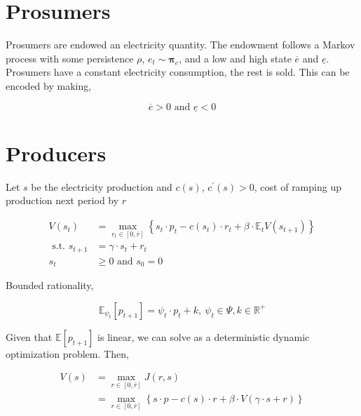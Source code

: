 \documentclass[american]{scrartcl}
\newcommand{\E}{\mathbb{E}}
\newcommand{\R}{\mathbb{R}}
\newcommand{\matr}[1]{\bm{#1}}
\begin{document}
\section{Prosumers}

Prosumers are endowed an electricity quantity. The endowment follows a Markov process with some persistence $\rho$, $e_t \sim \matr{\pi}_{e}$, and a low and high state $\overline{e}$ and $\underline{e}$. Prosumers have a constant electricity consumption, the rest is sold. This can be encoded by making,

\begin{equation}
	\overline{e} > 0 \text{ and } \underline{e} < 0
\end{equation}

\section{Producers}

Let $s$ be the electricity production and $c(s)$, $c^\prime(s) > 0$, cost of ramping up production next period by $r$

\begin{equation}
	\begin{split}
		V(s_t) &= \max_{r_t \in [0, \bar{r}]} \left\{ s_t \cdot p_t - c(s_t) \cdot r_t + \beta \cdot \E_t V(s_{t+1}) \right\} \\
		\text{ s.t. } s_{t+1} &= \gamma \cdot s_t + r_t \\ s_t &\geq 0 \text{ and } s_0 = 0
	\end{split}
\end{equation}

Bounded rationality,

\begin{equation}
	\E_{\psi_t}[p_{t+1}] = \psi_t \cdot p_t + k, \ \psi_t \in \Psi, k \in \R^+
\end{equation}


Given that $\E\left[p_{t+1}\right]$ is linear, we can solve as a deterministic dynamic optimization problem. Then,

\begin{equation}
	\begin{split}
		V(s) &= \max_{r \in [0, \bar{r}]} J(r, s) \\
		&= \max_{r \in [0, \bar{r}]} \left\{ s \cdot p - c(s) \cdot r + \beta \cdot V(\gamma \cdot s + r) \right\}
	\end{split}
\end{equation}
\end{document}

